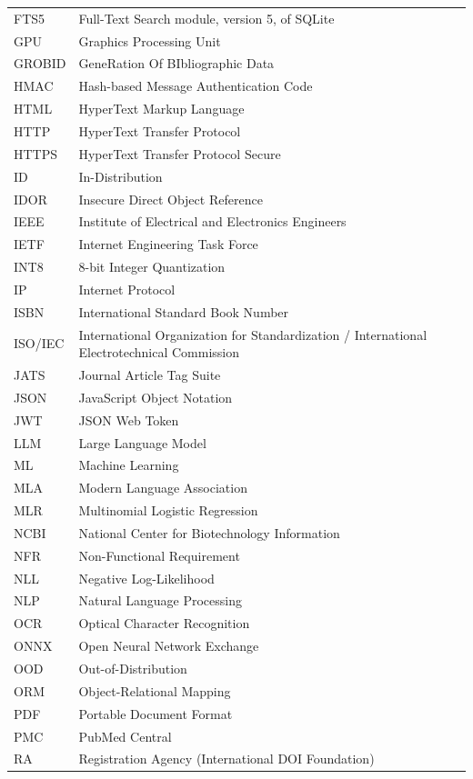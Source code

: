 {\begin{longtable}{P{0.22}P{0.78}}
FTS5 & Full-Text Search module, version 5, of SQLite \\
GPU & Graphics Processing Unit \\
GROBID & GeneRation Of BIbliographic Data \\
HMAC & Hash-based Message Authentication Code \\
HTML & HyperText Markup Language \\
HTTP & HyperText Transfer Protocol \\
HTTPS & HyperText Transfer Protocol Secure \\
ID & In-Distribution \\
IDOR & Insecure Direct Object Reference \\
IEEE & Institute of Electrical and Electronics Engineers \\
IETF & Internet Engineering Task Force \\
INT8 & 8-bit Integer Quantization \\
IP & Internet Protocol \\
ISBN & International Standard Book Number \\
ISO/IEC & International Organization for Standardization / International Electrotechnical Commission \\
JATS & Journal Article Tag Suite \\
JSON & JavaScript Object Notation \\
JWT & JSON Web Token \\
LLM & Large Language Model \\
ML & Machine Learning \\
MLA & Modern Language Association \\
MLR & Multinomial Logistic Regression \\
NCBI & National Center for Biotechnology Information \\
NFR & Non-Functional Requirement \\
NLL & Negative Log-Likelihood \\
NLP & Natural Language Processing \\
OCR & Optical Character Recognition \\
ONNX & Open Neural Network Exchange \\
OOD & Out-of-Distribution \\
ORM & Object-Relational Mapping \\
PDF & Portable Document Format \\
PMC & PubMed Central \\
RA & Registration Agency (International DOI Foundation) \\

\end{longtable}}
